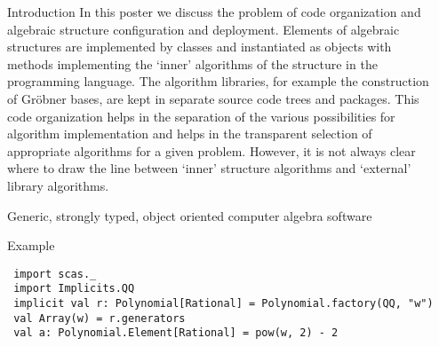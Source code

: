 \documentclass[final]{beamer}
\begin{document}
\begin{frame}[fragile]
\begin{columns}[t]
\begin{column}{.3\linewidth}
\begin{block}{\large Introduction}
In this poster we discuss the problem of code organization and
algebraic structure configuration and deployment. Elements of algebraic
structures are implemented by classes and instantiated as objects with
methods implementing the `inner' algorithms of the structure in the
programming language. The algorithm libraries, for example the
construction of Gr\"obner bases, are kept in separate source code trees
and packages. This code organization helps in the separation of the
various possibilities for algorithm implementation and helps in the
transparent selection of appropriate algorithms for a given problem.
However, it is not always clear where to draw the line between `inner'
structure algorithms and `external' library algorithms.
  \end{block}
  \hfill
  \begin{block}{\large Generic, strongly typed, object oriented computer algebra software}
      \centering
  \end{block}
  \hfill
  \begin{block}{\large Example}
\tiny 
\begin{lstlisting} 
 import scas._
 import Implicits.QQ
 implicit val r: Polynomial[Rational] = Polynomial.factory(QQ, "w")
 val Array(w) = r.generators
 val a: Polynomial.Element[Rational] = pow(w, 2) - 2 
\end{lstlisting} 
%
%
  \end{block}
\end{column}


\begin{column}{.3\linewidth}
 

\end{column}
\end{columns}
\end{frame}
\end{document}

